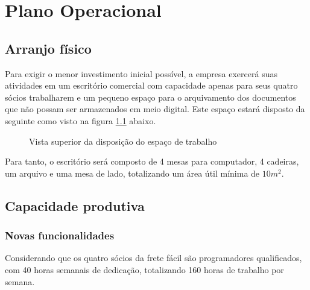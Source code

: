 \chapter{Plano Operacional}

\section{Arranjo físico}
Para exigir o menor investimento inicial possível, a empresa exercerá suas atividades em um escritório comercial com capacidade apenas para seus quatro sócios trabalharem e um pequeno espaço para o arquivamento dos documentos que não possam ser armazenados em meio digital. Este espaço estará disposto da seguinte como visto na figura \ref{fig:escritorio} abaixo.

\begin{figure}[!h]
  \begin{center}
    \caption{Vista superior da disposição do espaço de trabalho}
    \label{fig:escritorio}
  \end{center}
\end{figure}

Para tanto, o escritório será composto de 4 mesas para computador, 4 cadeiras, um arquivo e uma mesa de lado, totalizando um área útil mínima de $10m^{2}$.

\section{Capacidade produtiva}
  \subsection{Novas funcionalidades}\label{subsec:novasfuncionalidades}
  Considerando que os quatro sócios da frete fácil são programadores qualificados, com 40 horas semanais de dedicação, totalizando 160 horas de trabalho por semana.
  
